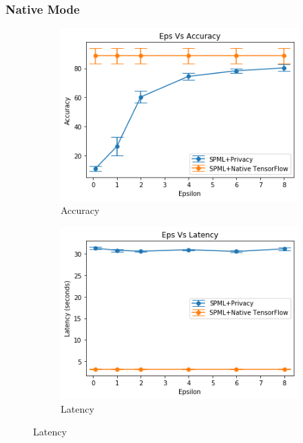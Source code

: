 \subsubsection{Native Mode}
\begin{figure}
     \begin{subfigure}{0.5\textwidth}
         \includegraphics[width=\textwidth]{images/Training/MnistNativeAccuracy.png}
         \caption{Accuracy}
         \label{fig:nativeMnistAccuracyTraining}
     \end{subfigure}
     \begin{subfigure}{0.5\textwidth}
         \includegraphics[width=\textwidth]{images/Training/MnistNativeLatency.png}
         \caption{Latency}
         \label{fig:nativeMnistLatencyTraining}
     \end{subfigure}

\end{figure}
